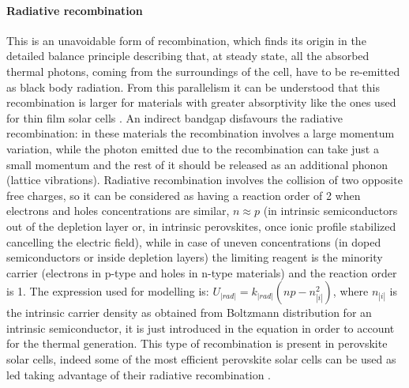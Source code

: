 		\paragraph{Radiative recombination}
		This is an unavoidable form of recombination, which finds its origin in the detailed balance principle describing that, at steady state, all the absorbed thermal photons, coming from the surroundings of the cell, have to be re-emitted as black body radiation.
		From this parallelism it can be understood that this recombination is larger for materials with greater absorptivity \cite{Nelson2003} like the ones used for thin film solar cells \cite{Tvingstedt2015}.
		An indirect bandgap disfavours the radiative recombination: in these materials the recombination involves a large momentum variation, while the photon emitted due to the recombination can take just a small momentum and the rest of it should be released as an additional phonon (lattice vibrations).
		Radiative recombination involves the collision of two opposite free charges, so it can be considered as having a reaction order of 2 when electrons and holes concentrations are similar, $n \approx p$ (in intrinsic semiconductors out of the depletion layer or, in intrinsic perovskites, once ionic profile stabilized cancelling the electric field), while in case of uneven concentrations (in doped semiconductors or inside depletion layers) the limiting reagent is the minority carrier (electrons in p-type and holes in n-type materials) and the reaction order is 1.
		The expression used for modelling is: $U_|rad| = k_|rad| (np-n_|i|^2)$, where $n_|i|$ is the intrinsic carrier density as obtained from Boltzmann distribution for an intrinsic semiconductor, it is just introduced in the equation in order to account for the thermal generation.
		This type of recombination is present in perovskite solar cells, indeed some of the most efficient perovskite solar cells can be used as \gls{led} taking advantage of their radiative recombination \cite{Bi2016}.

